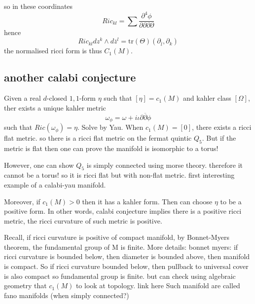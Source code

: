 so in these coordinates
\begin{equation}
    Ric_{kl} = \sum \frac{\partial^4 \phi}{\partial \partial \partial \partial}
\end{equation}
hence
\begin{equation}
    Ric_{kl}dz^k \wedge d \overline{z}^l = \mathrm{tr}(\Theta)(\partial_{\overline{l}}, \partial_k)
\end{equation}
the normalised ricci form is thus $C_1(M)$.
\subsection{another calabi conjecture} %
\label{sub:another_calabi_conjecture}
Given a real $d$-closed $1,1$-form $\eta$ such that $[\eta] = c_1(M)$ and kahler class $[\Omega]$, ther exists a unique kahler metric
\begin{equation}
    \omega_\phi = \omega + i \iota \partial \overline{\partial} \phi
\end{equation}
such that $Ric(\omega_\phi) = \eta$.
Solve by Yau.
When $c_1(M) = [0]$, there exists a ricci flat metric. so there is a ricci flat metric on the fermat quintic $Q_5$.
But if the metric is flat then one can prove the manifold is isomorphic to a torus!

However, one can show $Q_5$ is simply connected using morse theory. therefore it cannot be a torus! so it is ricci flat but with non-flat metric. first interesting example of a calabi-yau manifold.

Moreover, if $c_1(M) >0$ then it has a kahler form. Then can choose $\eta$ to be a positive form. In other words, calabi conjecture implies there is a positive ricci metric, the ricci curvature of such metric is positive.

Recall, if ricci curvature is positive of compact manifold, by Bonnet-Myers theorem, the fundamental group of M is finite.
More details: bonnet myers: if ricci curvature is bounded below, then diameter is bounded above, then manifold is compact.
So if ricci curvature bounded below, then pullback to universal cover is also compact so fundamental group is finite.
but can check using algebraic geometry that $c_1(M)$ to look at topology. link here
Such manifold are called fano manifolds (when simply connected?)
